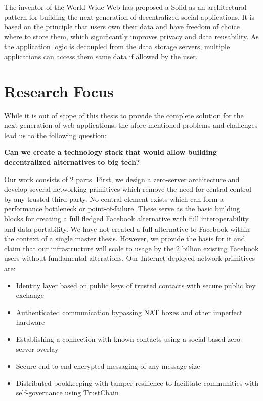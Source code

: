 The inventor of the World Wide Web has proposed a Solid \cite{solid} as an architectural pattern for building the next generation of decentralized social applications. It is based on the principle that users own their data and have freedom of choice where to store them, which significantly improves privacy and data reusability. As the application logic is decoupled from the data storage servers, multiple applications can access them same data if allowed by the user.

\fi

\section{Research Focus}

While it is out of scope of this thesis to provide the complete solution for the next generation of web applications, the afore-mentioned problems and challenges lead us to the following question:

\begin{displayquote}
\textbf{Can we create a technology stack that would allow building decentralized alternatives to big tech?}
\end{displayquote}

Our work consists of 2 parts. First, we design a zero-server architecture and develop several networking primitives which remove the need for central control by any trusted third party. No central element exists which can form a performance bottleneck or point-of-failure. These serve as the basic building blocks for creating a full fledged Facebook alternative with full interoperability and data portability. We have not created a full alternative to Facebook within the context of a single master thesis. However, we provide the basis for it and claim that our infrastructure will scale to usage by the 2 billion existing Facebook users without fundamental alterations. Our Internet-deployed network primitives are:

\begin{itemize}
    \item Identity layer based on public keys of trusted contacts with secure public key exchange
    \item Authenticated communication bypassing NAT boxes and other imperfect hardware
    \item Establishing a connection with known contacts using a social-based zero-server overlay %
    \item Secure end-to-end encrypted messaging of any message size
    \item Distributed bookkeeping with tamper-resilience to facilitate communities with self-governance using TrustChain
\end{itemize}

